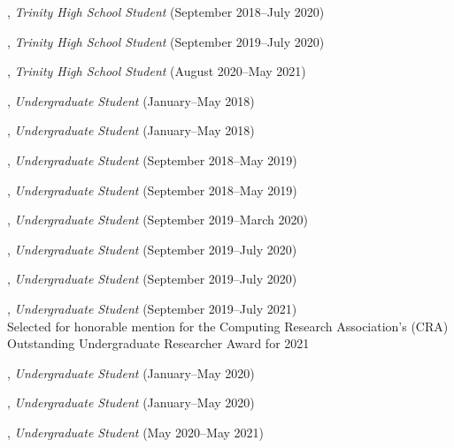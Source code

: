 \documentclass[10pt]{article}
\newenvironment{myindentpar}[1]%
{\begin{list}{}%
         {\setlength{\leftmargin}{#1}}%
         \item[]%
}
{\end{list}}
\newcounter{list}
\begin{document}
\begin{myindentpar}{0.75cm}
	
\hspace{-0.75cm}{\bf Eric Zhang}, \textit{Trinity High School Student} (September 2018--July 2020)

\hspace{-0.75cm}{\bf Michael Florin}, \textit{Trinity High School Student} (September 2019--July 2020)

\hspace{-0.75cm}{\bf Libby Garnett}, \textit{Trinity High School Student} (August 2020--May 2021)

\hspace{-0.75cm}{\bf Matthew Malir}, \textit{Undergraduate Student} (January--May 2018)
	
\hspace{-0.75cm}{\bf Sebastian Miner}, \textit{Undergraduate Student} (January--May 2018)

\hspace{-0.75cm}{\bf Matthew Schoenbauer}, \textit{Undergraduate Student} (September 2018--May 2019)
	
\hspace{-0.75cm}{\bf Tina Wu}, \textit{Undergraduate Student} (September 2018--May 2019)

\hspace{-0.75cm}{\bf Chan Hee Song}, \textit{Undergraduate Student} (September 2019--March 2020)

\hspace{-0.75cm}{\bf Xiangyu Dong}, \textit{Undergraduate Student} (September 2019--July 2020)

\hspace{-0.75cm}{\bf Tianze Zheng}, \textit{Undergraduate Student} (September 2019--July 2020)

\hspace{-0.75cm}{\bf Bo Ni}, \textit{Undergraduate Student} (September 2019--July 2021) \\
	Selected for honorable mention for the Computing Research Association's (CRA) Outstanding Undergraduate Researcher Award for 2021

\hspace{-0.75cm}{\bf Alvin Alaphat}, \textit{Undergraduate Student} (January--May 2020)

\hspace{-0.75cm}{\bf Luke Marushack}, \textit{Undergraduate Student} (January--May 2020)

\hspace{-0.75cm}{\bf Michael Lee}, \textit{Undergraduate Student} (May 2020--May 2021)


\end{myindentpar}
\end{document}
